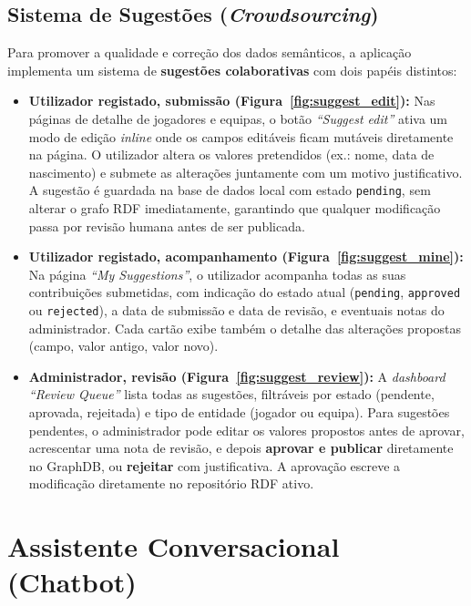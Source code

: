 \subsection{Sistema de Sugest\~oes (\textit{Crowdsourcing})}

Para promover a qualidade e corre\c{c}\~ao dos dados sem\^anticos, a aplica\c{c}\~ao implementa um sistema de \textbf{sugest\~oes colaborativas} com dois pap\'eis distintos:

\begin{itemize}
    \item \textbf{Utilizador registado, submiss\~ao (Figura~\ref{fig:suggest_edit}):} Nas p\'aginas de detalhe de jogadores e equipas, o bot\~ao \textit{``Suggest edit''} ativa um modo de edi\c{c}\~ao \textit{inline} onde os campos edit\'aveis ficam mut\'aveis diretamente na p\'agina. O utilizador altera os valores pretendidos (ex.: nome, data de nascimento) e submete as altera\c{c}\~oes juntamente com um motivo justificativo. A sugest\~ao \'e guardada na base de dados local com estado \texttt{pending}, sem alterar o grafo RDF imediatamente, garantindo que qualquer modifica\c{c}\~ao passa por revis\~ao humana antes de ser publicada.

    \item \textbf{Utilizador registado, acompanhamento (Figura~\ref{fig:suggest_mine}):} Na p\'agina \textit{``My Suggestions''}, o utilizador acompanha todas as suas contribui\c{c}\~oes submetidas, com indica\c{c}\~ao do estado atual (\texttt{pending}, \texttt{approved} ou \texttt{rejected}), a data de submiss\~ao e data de revis\~ao, e eventuais notas do administrador. Cada cart\~ao exibe tamb\'em o detalhe das altera\c{c}\~oes propostas (campo, valor antigo, valor novo).

    \item \textbf{Administrador, revis\~ao (Figura~\ref{fig:suggest_review}):} A \textit{dashboard} \textit{``Review Queue''} lista todas as sugest\~oes, filtr\'aveis por estado (pendente, aprovada, rejeitada) e tipo de entidade (jogador ou equipa). Para sugest\~oes pendentes, o administrador pode editar os valores propostos antes de aprovar, acrescentar uma nota de revis\~ao, e depois \textbf{aprovar e publicar} diretamente no GraphDB, ou \textbf{rejeitar} com justificativa. A aprova\c{c}\~ao escreve a modifica\c{c}\~ao diretamente no reposit\'orio RDF ativo.
\end{itemize}

\section{Assistente Conversacional (Chatbot)}

